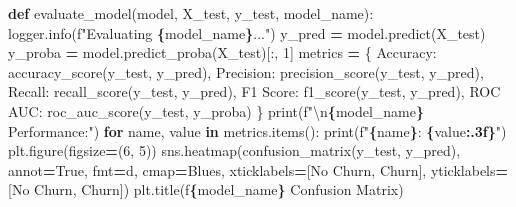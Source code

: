 \documentclass[preprint, 3p,
authoryear]{elsarticle} %
\newenvironment{Shaded}{\begin{snugshade}}{\end{snugshade}}
\newcommand{\BuiltInTok}[1]{#1}
\newcommand{\CharTok}[1]{\textcolor[rgb]{0.31,0.60,0.02}{#1}}
\newcommand{\ControlFlowTok}[1]{\textcolor[rgb]{0.13,0.29,0.53}{\textbf{#1}}}
\newcommand{\DecValTok}[1]{\textcolor[rgb]{0.00,0.00,0.81}{#1}}
\newcommand{\KeywordTok}[1]{\textcolor[rgb]{0.13,0.29,0.53}{\textbf{#1}}}
\newcommand{\NormalTok}[1]{#1}
\newcommand{\OperatorTok}[1]{\textcolor[rgb]{0.81,0.36,0.00}{\textbf{#1}}}
\newcommand{\SpecialCharTok}[1]{\textcolor[rgb]{0.81,0.36,0.00}{\textbf{#1}}}
\newcommand{\SpecialStringTok}[1]{\textcolor[rgb]{0.31,0.60,0.02}{#1}}
\newcommand{\StringTok}[1]{\textcolor[rgb]{0.31,0.60,0.02}{#1}}
\newcommand{\VariableTok}[1]{\textcolor[rgb]{0.00,0.00,0.00}{#1}}
\begin{document}
\begin{Shaded}
\begin{Highlighting}[]
\KeywordTok{def}\NormalTok{ evaluate\_model(model, X\_test, y\_test, model\_name):}
\NormalTok{    logger.info(}\SpecialStringTok{f"Evaluating }\SpecialCharTok{\{}\NormalTok{model\_name}\SpecialCharTok{\}}\SpecialStringTok{..."}\NormalTok{)}
\NormalTok{    y\_pred }\OperatorTok{=}\NormalTok{ model.predict(X\_test)}
\NormalTok{    y\_proba }\OperatorTok{=}\NormalTok{ model.predict\_proba(X\_test)[:, }\DecValTok{1}\NormalTok{]}
\NormalTok{    metrics }\OperatorTok{=}\NormalTok{ \{}
        \StringTok{\textquotesingle{}Accuracy\textquotesingle{}}\NormalTok{: accuracy\_score(y\_test, y\_pred),}
        \StringTok{\textquotesingle{}Precision\textquotesingle{}}\NormalTok{: precision\_score(y\_test, y\_pred),}
        \StringTok{\textquotesingle{}Recall\textquotesingle{}}\NormalTok{: recall\_score(y\_test, y\_pred),}
        \StringTok{\textquotesingle{}F1 Score\textquotesingle{}}\NormalTok{: f1\_score(y\_test, y\_pred),}
        \StringTok{\textquotesingle{}ROC AUC\textquotesingle{}}\NormalTok{: roc\_auc\_score(y\_test, y\_proba)}
\NormalTok{    \}}
    \BuiltInTok{print}\NormalTok{(}\SpecialStringTok{f"}\CharTok{\textbackslash{}n}\SpecialCharTok{\{}\NormalTok{model\_name}\SpecialCharTok{\}}\SpecialStringTok{ Performance:"}\NormalTok{)}
    \ControlFlowTok{for}\NormalTok{ name, value }\KeywordTok{in}\NormalTok{ metrics.items():}
        \BuiltInTok{print}\NormalTok{(}\SpecialStringTok{f"}\SpecialCharTok{\{}\NormalTok{name}\SpecialCharTok{\}}\SpecialStringTok{: }\SpecialCharTok{\{}\NormalTok{value}\SpecialCharTok{:.3f\}}\SpecialStringTok{"}\NormalTok{)}
\NormalTok{    plt.figure(figsize}\OperatorTok{=}\NormalTok{(}\DecValTok{6}\NormalTok{, }\DecValTok{5}\NormalTok{))}
\NormalTok{    sns.heatmap(confusion\_matrix(y\_test, y\_pred), annot}\OperatorTok{=}\VariableTok{True}\NormalTok{, fmt}\OperatorTok{=}\StringTok{\textquotesingle{}d\textquotesingle{}}\NormalTok{, cmap}\OperatorTok{=}\StringTok{\textquotesingle{}Blues\textquotesingle{}}\NormalTok{, }
\NormalTok{                xticklabels}\OperatorTok{=}\NormalTok{[}\StringTok{\textquotesingle{}No Churn\textquotesingle{}}\NormalTok{, }\StringTok{\textquotesingle{}Churn\textquotesingle{}}\NormalTok{], yticklabels}\OperatorTok{=}\NormalTok{[}\StringTok{\textquotesingle{}No Churn\textquotesingle{}}\NormalTok{, }\StringTok{\textquotesingle{}Churn\textquotesingle{}}\NormalTok{])}
\NormalTok{    plt.title(}\SpecialStringTok{f\textquotesingle{}}\SpecialCharTok{\{}\NormalTok{model\_name}\SpecialCharTok{\}}\SpecialStringTok{ Confusion Matrix\textquotesingle{}}\NormalTok{)}

\end{Highlighting}
\end{Shaded}
\end{document}
